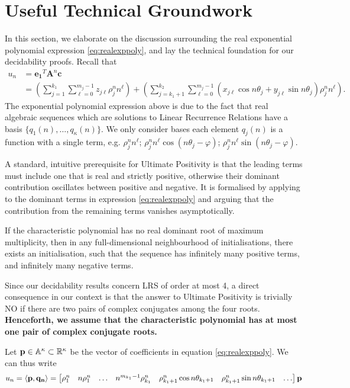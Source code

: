 \section{Useful Technical Groundwork}
\label{section:utils}
In this section, we elaborate on the discussion surrounding the real exponential polynomial expression \ref{eq:realexppoly}, and lay the technical foundation for our decidability proofs. Recall that
\begin{align}
\label{eq:realexppolycopy}
u_n &= \mathbf{e_1}^T\mathbf{A}^n\mathbf{c}\\
&= \left(\sum_{j=1}^{k_1}\sum_{\ell = 0}^{m_j-1} z_{j\ell}\rho_j^n n^\ell\right) + \left(\sum_{j=k_1 + 1}^{k_2} \sum_{\ell = 0}^{m_j-1} (x_{j\ell} \cos n\theta_j + y_{j\ell}\sin n\theta_j)\rho_j^n n^\ell\right).
\end{align}
The exponential polynomial expression above is due to the fact that real algebraic sequences which are solutions to Linear Recurrence Relations have a basis $\{q_1(n), \dots, q_\kappa(n)\}$. We only consider bases each element $q_j(n)$ is a function with a single term, e.g. $\rho_j^n n^\ell$; $\rho_j^n n^\ell \cos(n\theta_j - \varphi)$; $\rho_j^n n^\ell \sin(n\theta_j - \varphi)$.

A standard, intuitive prerequisite for Ultimate Positivity is that the leading terms must include one that is real and strictly positive, otherwise their dominant contribution oscillates between positive and negative. It is formalised by applying \cite[Lemma 4]{Braverman06} to the dominant terms in expression \ref{eq:realexppoly} and arguing that the contribution from the remaining terms vanishes asymptotically. 
\begin{proposition}
\label{prop:folklore}
If the characteristic polynomial has no real dominant root of maximum multiplicity, then in any full-dimensional neighbourhood of initialisations, there exists an initialisation, such that the sequence has infinitely many positive terms, and infinitely many negative terms.
\end{proposition}

Since our decidability results concern LRS of order at most 4, a direct consequence in our context is that the answer to Ultimate Positivity is trivially NO if there are two pairs of complex conjugates among the four roots. \textbf{Henceforth, we assume that the characteristic polynomial has at most one pair of complex conjugate roots.}


Let $\mathbf{p} \in \mathbb{A}^{\kappa} \subset \mathbb{R}^\kappa$ be the vector of coefficients in equation \ref{eq:realexppoly}. We can thus write
\begin{equation}
\label{eq:innerprod}
u_n = \langle\mathbf{p}, \mathbf{q_n}\rangle= 
\begin{bmatrix}
\rho_1^n & n \rho_1^n & \dots & n^{m_{k_1}-1}\rho_{k_1}^n & \rho_{k_1+1}^n\cos n\theta_{k_1+1} & \rho_{k_1+1}^n\sin n\theta_{k_1+1} & \dots
\end{bmatrix}\mathbf{p}
\end{equation}

